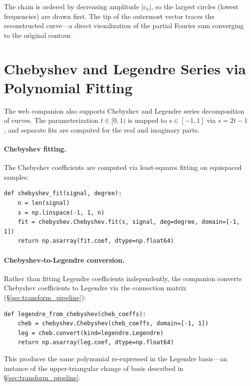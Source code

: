 \documentclass[12pt,a4paper]{report}
\theoremstyle{thms}
\theoremstyle{defns}
\begin{document}
The chain is ordered by decreasing amplitude $|c_n|$, so the largest circles (lowest frequencies) are drawn first. The tip of the outermost vector traces the reconstructed curve—a direct visualization of the partial Fourier sum converging to the original contour.

\section{Chebyshev and Legendre Series via Polynomial Fitting}
\label{app:poly_fitting}

The web companion also supports Chebyshev and Legendre series decomposition of curves. The parameterization $t \in [0, 1)$ is mapped to $s \in [-1, 1]$ via $s = 2t - 1$, and separate fits are computed for the real and imaginary parts.

\paragraph{Chebyshev fitting.} The Chebyshev coefficients are computed via least-squares fitting on equispaced samples:

\begin{lstlisting}[caption={Chebyshev coefficient computation (\texttt{bases\_fitting.py})}]
def chebyshev_fit(signal, degree):
    n = len(signal)
    s = np.linspace(-1, 1, n)
    fit = chebyshev.Chebyshev.fit(s, signal, deg=degree, domain=[-1, 1])
    return np.asarray(fit.coef, dtype=np.float64)
\end{lstlisting}

\paragraph{Chebyshev-to-Legendre conversion.} Rather than fitting Legendre coefficients independently, the companion converts Chebyshev coefficients to Legendre via the connection matrix (\S\ref{sec:transform_pipeline}):

\begin{lstlisting}[caption={Chebyshev to Legendre conversion (\texttt{bases\_fitting.py})}]
def legendre_from_chebyshev(cheb_coeffs):
    cheb = chebyshev.Chebyshev(cheb_coeffs, domain=[-1, 1])
    leg = cheb.convert(kind=legendre.Legendre)
    return np.asarray(leg.coef, dtype=np.float64)
\end{lstlisting}

This produces the same polynomial re-expressed in the Legendre basis—an instance of the upper-triangular change of basis described in \S\ref{sec:transform_pipeline}.
\end{document}
